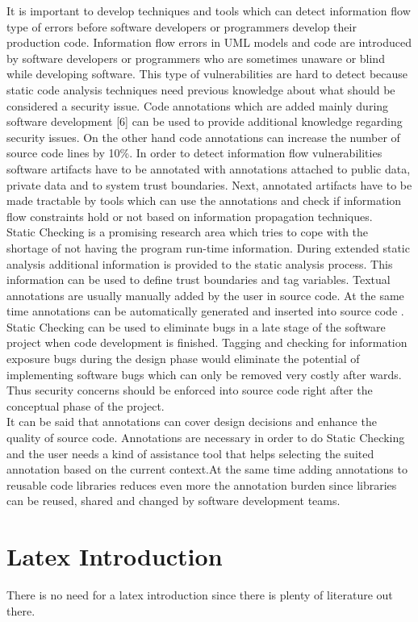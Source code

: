 It is important to develop techniques and tools which can detect information flow type of errors before software developers or programmers develop their production code. Information flow errors in UML models and code are introduced by software developers or programmers who are sometimes unaware or blind while developing software. This type of vulnerabilities are hard to detect because static code analysis techniques need previous knowledge about what should be considered a security issue. Code annotations which are added mainly during software development [6] can be used to provide additional knowledge regarding security issues. On the other hand code annotations can increase the number of source code lines by 10\%. In order to detect information flow vulnerabilities software artifacts have to be annotated with annotations attached to public data, private data and to system trust boundaries. Next, annotated artifacts have to be made tractable by tools which can use the annotations and check if information flow constraints hold or not based on information propagation techniques.\\

Static Checking is a promising research area which tries to cope with the shortage of not having the program run-time information. During extended static analysis additional information is provided to the static analysis process. This information can be used to define trust boundaries and tag variables. Textual annotations are usually manually added by the user in source code. At the same time annotations can be automatically generated and inserted into source code . Static Checking can be used to eliminate bugs in a late stage of the software project when code development is finished. Tagging and checking for information exposure bugs during the design phase would eliminate the potential of implementing software bugs which can only be removed very costly after wards. Thus security concerns should be enforced into source code right after the conceptual phase of the project. \\

It can be said that annotations can cover design decisions and enhance the quality of source code. Annotations are necessary in order to do Static Checking and the user needs a kind of assistance tool that helps selecting the suited annotation based on the current context.At the same time adding annotations to reusable code libraries reduces even more the annotation burden since libraries can be reused, shared and changed by software development teams.\\

 
\section{Latex Introduction}
There is no need for a latex introduction since there is plenty of literature out there.
 


